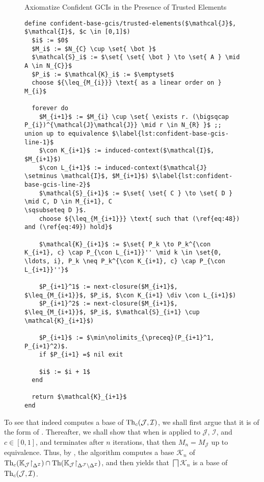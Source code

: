 
\begin{figure}[tp]
  \begin{Algorithm} Axiomatize Confident GCIs in the Presence of Trusted Elements
    \hspace*{0cm}
    \label{alg:confident-base-gcis/trusted-objects}
    \begin{lstlisting}
define confident-base-gcis/trusted-elements($\mathcal{J}$, $\mathcal{I}$, $c \in [0,1]$)
  $i$ := $0$
  $M_i$ := $N_{C} \cup \set{ \bot }$
  $\mathcal{S}_i$ := $\set{ \set{ \bot } \to \set{ A } \mid A \in N_{C}}$
  $P_i$ := $\mathcal{K}_i$ := $\emptyset$
  choose ${\leq_{M_{i}}} \text{ as a linear order on } M_{i}$
  
  forever do
    $M_{i+1}$ := $M_{i} \cup \set{ \exists r. (\bigsqcap P_{i})^{\mathcal{J}\mathcal{J}} \mid r \in N_{R} }$ ;; union up to equivalence $\label{lst:confident-base-gcis-line-1}$
    $\con K_{i+1}$ := induced-context($\mathcal{I}$, $M_{i+1}$)
    $\con L_{i+1}$ := induced-context($\mathcal{J} \setminus \mathcal{I}$, $M_{i+1}$) $\label{lst:confident-base-gcis-line-2}$
    $\mathcal{S}_{i+1}$ := $\set{ \set{ C } \to \set{ D } \mid C, D \in M_{i+1}, C
\sqsubseteq D }$.
    choose ${\leq_{M_{i+1}}} \text{ such that (\ref{eq:48}) and (\ref{eq:49}) hold}$

    $\mathcal{K}_{i+1}$ := $\set{ P_k \to P_k^{\con K_{i+1}, c} \cap P_{\con L_{i+1}}'' \mid k \in \set{0, \ldots, i}, P_k \neq P_k^{\con K_{i+1}, c} \cap P_{\con L_{i+1}}''}$

    $P_{i+1}^1$ := next-closure($M_{i+1}$, $\leq_{M_{i+1}}$, $P_i$, $\con K_{i+1} \div \con L_{i+1}$)
    $P_{i+1}^2$ := next-closure($M_{i+1}$, $\leq_{M_{i+1}}$, $P_i$, $\mathcal{S}_{i+1} \cup \mathcal{K}_{i+1}$)

    $P_{i+1}$ := $\min\nolimits_{\preceq}(P_{i+1}^1, P_{i+1}^2)$.
    if $P_{i+1} =$ nil exit

    $i$ := $i + 1$
  end

  return $\mathcal{K}_{i+1}$  
end
    \end{lstlisting}
  \end{Algorithm}
\end{figure}

To see that  indeed computes a base of
$\operatorname{Th}_{c}(\mathcal{J}, \mathcal{I})$, we shall first argue that it is of the form of
.  Thereafter, we shall show
that when  is applied to $\mathcal{J}$,
$\mathcal{I}$, and $c \in [0,1]$, and terminates after $n$ iterations, that then $M_{n} =
M_{\mathcal{J}}$ up to equivalence.  Thus, by
, the
algorithm computes a base $\mathcal{K}_{n}$ of $\operatorname{Th}_{c}({\mathbb{K}}_{\mathcal{J}}
\mathord{\upharpoonright}_{\Delta^{\mathcal{I}}}) \cap \operatorname{Th}({\mathbb{K}}_{\mathcal{J}}
\mathord{\upharpoonright}_{\Delta^{\mathcal{J}} \setminus \Delta^{\mathcal{I}}})$, and then
 yields that
$\bigsqcap \mathcal{K}_{n}$ is a base of $\operatorname{Th}_{c}(\mathcal{J}, \mathcal{I})$.

